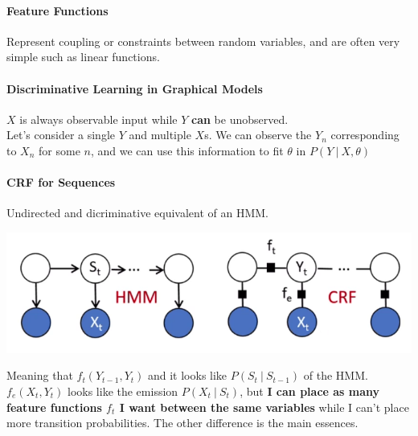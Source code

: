\documentclass[10pt]{report}
\begin{document}
\paragraph{Feature Functions} Represent coupling or constraints between random variables, and are often very simple such as linear functions.
\paragraph{Discriminative Learning in Graphical Models} $X$ is always observable input while $Y$ \textbf{can} be unobserved.\\
Let's consider a single $Y$ and multiple $X$s. We can observe the $Y_n$ corresponding to $X_n$ for some $n$, and we can use this information to fit $\theta$ in $P(Y\:|\:X,\theta)$
\paragraph{CRF for Sequences} Undirected and dicriminative equivalent of an HMM.\begin{center}
	\includegraphics[scale=0.5]{36.png}
\end{center}
Meaning that $f_t(Y_{t-1}, Y_t)$ and it looks like $P(S_t\:|\:S_{t-1})$ of the HMM. $f_e(X_t, Y_t)$ looks like the emission $P(X_t\:|\:S_t)$, but \textbf{I can place as many feature functions $f_t$ I want between the same variables} while I can't place more transition probabilities. The other difference is the main essences.
\end{document}
